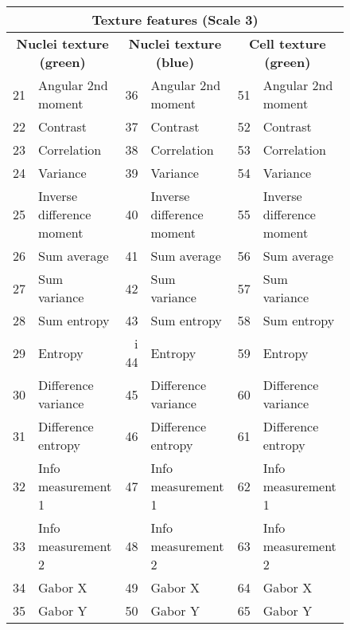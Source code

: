 \documentclass[oneside, a4paper, draft]{memoir} %
\begin{document}
\begin{figure}[here]
\begin{tabularx}{\textwidth}{|rX|rX|rX|}
	\multicolumn{6}{c}{Texture features (Scale 3)}\\
	\hline
	\multicolumn{2}{|c|}{\textbf{Nuclei texture (green)}} &
	\multicolumn{2}{c|}{\textbf{Nuclei texture (blue)}} &
	\multicolumn{2}{c|}{\textbf{Cell texture (green)}}\\
	\hline
	21 & Angular 2nd moment & 			36 & Angular 2nd moment & 			51 & Angular 2nd moment \\
	22 & Contrast & 					37 & Contrast & 					52 & Contrast \\
	23 & Correlation & 					38 & Correlation & 					53 & Correlation \\
	24 & Variance & 					39 & Variance & 					54 & Variance \\
	25 & Inverse difference moment & 	40 & Inverse difference moment & 	55 & Inverse difference moment \\
	26 & Sum average & 					41 & Sum average & 					56 & Sum average \\
	27 & Sum variance & 				42 & Sum variance & 				57 & Sum variance \\
	28 & Sum entropy & 					43 & Sum entropy & 					58 & Sum entropy \\
	29 & Entropy & i					44 & Entropy & 						59 & Entropy \\
	30 & Difference variance & 			45 & Difference variance & 			60 & Difference variance \\
	31 & Difference entropy & 			46 & Difference entropy & 			61 & Difference entropy \\
	32 & Info measurement 1 & 			47 & Info measurement 1 & 			62 & Info measurement 1 \\
	33 & Info measurement 2 & 			48 & Info measurement 2 & 			63 & Info measurement 2 \\
	34 & Gabor X & 						49 & Gabor X & 						64 & Gabor X \\
	35 & Gabor Y & 						50 & Gabor Y & 						65 & Gabor Y \\
	\hline
\end{tabularx}

\vspace{0.5cm}


\end{figure}
\end{document}
